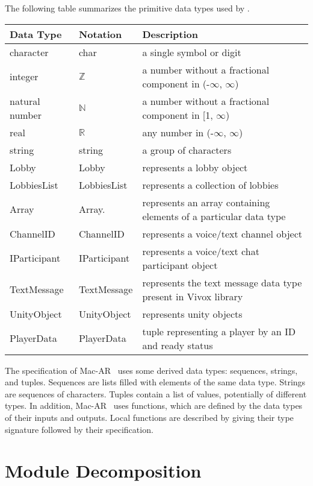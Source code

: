 \documentclass[12pt, titlepage]{article}
\begin{document}
The following table summarizes the primitive data types used by \progname. 

\begin{center}
\renewcommand{\arraystretch}{1.2}
\noindent 
\begin{tabular}{l l p{7.5cm}} 
\toprule 
\textbf{Data Type} & \textbf{Notation} & \textbf{Description}\\ 
\midrule
character & char & a single symbol or digit\\
integer & $\mathbb{Z}$ & a number without a fractional component in (-$\infty$, $\infty$) \\
natural number & $\mathbb{N}$ & a number without a fractional component in [1, $\infty$) \\
real & $\mathbb{R}$ & any number in (-$\infty$, $\infty$)\\
string & string & a group of characters\\
Lobby & Lobby & represents a lobby object\\
LobbiesList & LobbiesList & represents a collection of lobbies\\
Array & Array. & represents an array containing elements of a particular data type\\
ChannelID & ChannelID & represents a voice/text channel object\\
IParticipant & IParticipant & represents a voice/text chat participant object \\
TextMessage & TextMessage & represents the text message data type present in Vivox library\\
UnityObject & UnityObject & represents unity objects\\
PlayerData & PlayerData & tuple representing a player by an ID and ready status\\
\bottomrule
\end{tabular} 
\end{center}

\noindent
The specification of Mac-AR \ uses some derived data types: sequences, strings, and
tuples. Sequences are lists filled with elements of the same data type. Strings
are sequences of characters. Tuples contain a list of values, potentially of
different types. In addition, Mac-AR \ uses functions, which
are defined by the data types of their inputs and outputs. Local functions are
described by giving their type signature followed by their specification.

\section{Module Decomposition}
\end{document}
